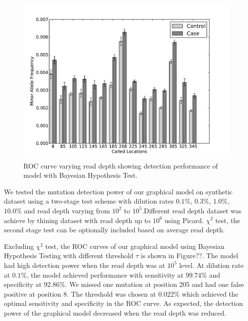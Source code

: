 \documentclass[11pt,reqno]{amsart}
\begin{document}
\begin{figure}[h]
\begin{center}
\includegraphics[width=160mm]{pdf_figs/MuBarPlot.pdf}
\caption{ROC curve varying read depth showing detection performance of model with Bayesian Hypothesis Test.}
\label{fig:ROC_without_chi2}
\end{center}
\end{figure}

We tested the mutation detection power of our graphical model on synthetic dataset using a two-stage test scheme with dilution rates $0.1\%$, $0.3\%$, $1.0\%$, $10.0\%$ and read depth varying from $10^2$ to $10^5$.Different read depth dataset was achieve by thining dataset with read depth up to $10^6$ using Picard. $\chi^2$ test, the second stage test can be optionally included based on average read depth.

Excluding $\chi^2$ test, the ROC curves of our graphical model using Bayesian Hypothesis Testing with different threshold $\tau$ is shown in Figure??. The model had high detection power when the read depth was at $10^5$ level. At dilution rate at $0.1\%$, the model achieved performance with sensitivity at 99.74\% and specificity at 92.86\%. We missed one mutation at position 205 and had one false positive at position 8. The threshold was chosen at 0.022\% which achieved the optimal sensitivity and specificity in the ROC curve. As expected, the detection power of the graphical model decreased when the read depth was reduced. 
\end{document}
